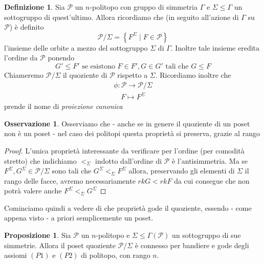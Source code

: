 \documentclass[a4paper,12pt]{report}
\newcommand{\p}{\mathcal{P}}
\theoremstyle{plain}
\theoremstyle{definition}
\newtheorem{defin}[teo]{Definizione}
\newtheorem{prop}[teo]{Proposizione}
\newtheorem{oss}[teo]{Osservazione}
\begin{document}
\begin{defin}
Sia $\p$ un $n$-politopo con gruppo di simmetria $\Gamma$ e $\Sigma\leq\Gamma$ un sottogruppo di quest'ultimo. Allora ricordiamo che (in seguito all'azione
di $\Gamma$ su $\p$) \`e definito
\begin{equation*}
\p/\Sigma=\left\{F^\Sigma\mid F\in\p\right\}
\end{equation*}
l'insieme delle orbite a mezzo del sottogruppo $\Sigma$ di $\Gamma$. Inoltre tale insieme eredita l'ordine da $\p$ ponendo
\begin{equation*}
G'\leq F'\text{ se esistono }F\in F',G\in G'\text{ tali che }G\leq F
\end{equation*}
Chiameremo $\p/\Sigma$ il quoziente di $\p$ rispetto a $\Sigma$. Ricordiamo inoltre che
\begin{gather*}
\phi:\p\longrightarrow\p/\Sigma\\
\quad F\mapsto F^\Sigma
\end{gather*}
prende il nome di \emph{proiezione canonica}
\end{defin}
\begin{oss}
\label{oss:QuotientPolytopeIsPoset}
Osserviamo che - anche se in genere il quoziente di un poset non \`e un poset - nel caso dei politopi questa propriet\`a si preserva, grazie al rango
\end{oss}
\begin{proof}
L'unica propriet\`a interessante da verificare per l'ordine (per comodit\`a stretto) che indichiamo $<_\Sigma$ indotto dall'ordine di $\p$ \`e
l'antisimmetria. Ma se $F^\Sigma,G^\Sigma\in\p/\Sigma$ sono tali che $G^\Sigma<_\Sigma F^\Sigma$ allora, preservando gli elementi di $\Sigma$ il rango
delle facce, avremo necessariamente $rkG<rkF$ da cui consegue che non potr\`a valere anche $F^\Sigma<_\Sigma G^\Sigma$
\end{proof}
Cominciamo quindi a vedere di che propriet\`a gode il quoziente, essendo - come appena visto - a priori semplicemente un poset.
\begin{prop}
\label{prop:QuotientP1P2}
Sia $\p$ un $n$-politopo e $\Sigma\leq\Gamma(\p)$ un sottogruppo di sue simmetrie. Allora il poset quoziente $\p/\Sigma$ \`e connesso
per bandiere e gode degli assiomi $(P1)$ e $(P2)$
di politopo, con rango $n$.
\end{prop}
\end{document}
